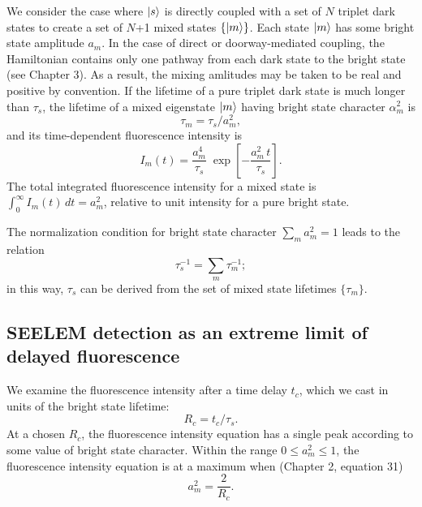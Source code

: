 \documentclass[12pt,draft]{mitthesis}
\begin{document}
We consider the case where $\mathinner{|{s}\rangle}$ is directly coupled with a set of
$N$ triplet dark states to create a set of $N$+1 mixed states
$\lbrace\mathinner{|{m}\rangle}\rbrace$.  Each state $\mathinner{|{m}\rangle}$ has some bright state
amplitude $a_m$.  In the case of direct or doorway-mediated coupling,
the Hamiltonian contains only one pathway from each dark state to the
bright state (see Chapter 3).  As a result, the mixing amlitudes may
be taken to be real and positive by convention.  If the lifetime of a
pure triplet dark state is much longer than $\tau_s$, the lifetime of
a mixed eigenstate $\mathinner{|{m}\rangle}$ having bright state character
$\alpha_m^2$ is
\begin{equation}
  \label{eq:tau-m}
  \tau_m = \tau_s / a_m^2,
\end{equation}
and its time-dependent fluorescence intensity is
\begin{equation}
  \label{eq:int-m}
  I_m(t) = \frac{a_m^4}{\tau_s} \;
           \exp \left[
             -\frac{a_m^2 \, t}{\tau_s} 
           \right].
\end{equation}
The total integrated fluorescence intensity for a mixed state is
$\int_0^{\infty} I_m(t) \, dt = a_m^2$, relative to unit intensity for
a pure bright state.

The normalization condition for bright state character $\sum_m a_m^2 =
1$ leads to the relation
\begin{equation}
  \tau_s^{-1} = \sum_m \tau_m^{-1};
\end{equation}
in this way, $\tau_s$ can be derived from the set of mixed state
lifetimes $\lbrace \tau_m \rbrace$.

\subsection{SEELEM detection as an extreme limit of delayed fluorescence}

We examine the fluorescence intensity after a time delay $t_c$,
which we cast in units of the bright state lifetime:
\begin{equation}
  R_c = t_c / \tau_s.
\end{equation}
At a chosen $R_c$, the fluorescence intensity equation has a single
peak according to some value of bright state character.  Within the
range $0 \le a_m^2 \le 1$, the fluorescence intensity equation is at a
maximum when (Chapter 2, equation 31)
\begin{equation}
  \label{eq:am-max}
  a_m^2 = \frac{2}{R_c}.
\end{equation}
\end{document}
